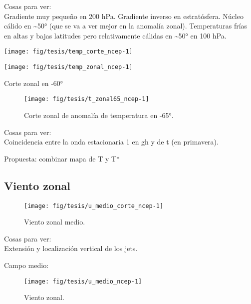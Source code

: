 \documentclass[spanish,a4paper]{book}
\begin{document}
Cosas para ver:\\
Gradiente muy pequeño en 200 hPa. Gradiente inverso en estratósfera.
Núcleo cálido en \textasciitilde{}50° (que se va a ver mejor en la
anomalía zonal). Temperaturas frías en altas y bajas latitudes pero
relativamente cálidas en \textasciitilde{}50° en 100 hPa.

\begin{center}\texttt{[image: fig/tesis/temp\_corte\_ncep-1]} \end{center}

\begin{center}\texttt{[image: fig/tesis/temp\_zonal\_ncep-1]} \end{center}

Corte zonal en -60°

\begin{figure}

{\centering \texttt{[image: fig/tesis/t\_zonal65\_ncep-1]} 

}

\caption{Corte zonal de anomalía de temperatura en -65°.}\label{fig:t_zonal65_ncep}
\end{figure}

Cosas para ver:\\
Coincidencia entre la onda estacionaria 1 en gh y de t (en primavera).

Propuesta: combinar mapa de T y T*

\subsection{Viento zonal}\label{viento-zonal}

\begin{figure}

{\centering \texttt{[image: fig/tesis/u\_medio\_corte\_ncep-1]} 

}

\caption{Viento zonal medio.}\label{fig:u_medio_corte_ncep}
\end{figure}

Cosas para ver:\\
Extensión y localización vertical de los jets.

Campo medio:

\begin{figure}

{\centering \texttt{[image: fig/tesis/u\_medio\_ncep-1]} 

}

\caption{Viento zonal.}\label{fig:u_medio_ncep}
\end{figure}
\end{document}
